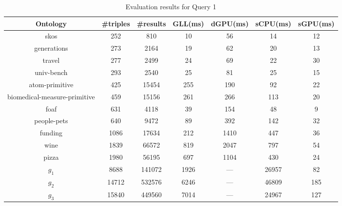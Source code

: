 \documentclass[runningheads,a4paper]{llncs}
\begin{document}
\begin{table}[ht]
	\centering
	\caption{Evaluation results for Query 1}
	\label{tbl1}
	
	\begin{tabular}{ | c | c | c | c | c | c | c |}
		\hline
		Ontology & \#triples & \#results & GLL(ms) & dGPU(ms) & sCPU(ms) & sGPU(ms) \\
		\hline 
		\hline
		skos        & 252 & 810 & 10 & 56 & 14 & 12\\
		generations & 273 & 2164 & 19 & 62 & 20 & 13\\
		travel      & 277 & 2499 & 24 & 69 & 22 & 30\\
		univ-bench  & 293 & 2540 & 25 & 81 & 25 & 15\\
		atom-primitive & 425 & 15454 & 255 & 190 & 92 & 22\\
		biomedical-measure-primitive & 459 & 15156 & 261 & 266 & 113 & 20\\
		foaf        & 631 & 4118 & 39 & 154 & 48 & 9\\
		people-pets & 640 & 9472 & 89 & 392 & 142 & 32\\
		funding     & 1086 & 17634 & 212 & 1410 & 447 & 36\\
		wine        & 1839 & 66572 & 819 & 2047 & 797 & 54\\
		pizza       & 1980 & 56195 & 697 & 1104 & 430 & 24\\
		$g_{1}$     & 8688 & 141072 & 1926 & --- & 26957 & 82\\
		$g_{2}$     & 14712 & 532576 & 6246 & --- & 46809 & 185\\
		$g_{3}$     & 15840 & 449560 & 7014 & --- & 24967 & 127\\
		\hline
	\end{tabular}
	
\end{table}
\end{document}
